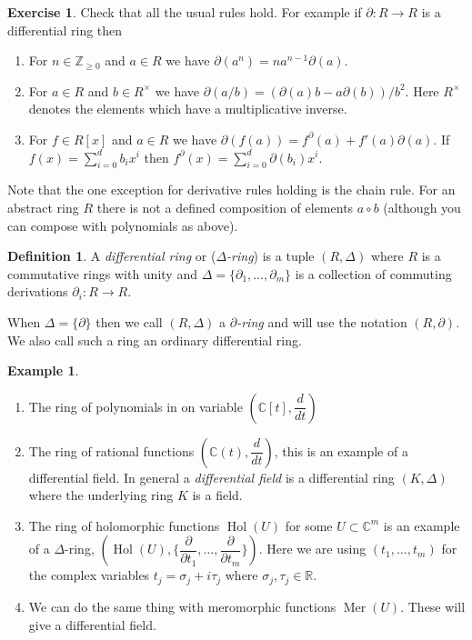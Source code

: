 \documentclass[12pt]{book}
\numberwithin{equation}{section}
\theoremstyle{definition}
\newtheorem{definition}[theorem]{Definition}
\newtheorem{example}[theorem]{Example}
\newtheorem{exercise}[theorem]{Exercise}
\theoremstyle{remark}
\newcommand{\ZZ}{\mathbb{Z}}
\newcommand{\RR}{\mathbb{R}}
\newcommand{\CC}{\mathbb{C}}
\newcommand{\hol}{\operatorname{Hol}}
\newcommand{\Mer}{\operatorname{Mer}}
\begin{document}
\begin{exercise}
	Check that all the usual rules hold. For example if $\partial:R \to R$ is a differential ring then 
	\begin{enumerate}
		\item For $n\in \ZZ_{\geq 0}$ and $a \in R$ we have $\partial(a^n) = na^{n-1}\partial(a)$.
		\item For $a \in R$ and $b\in R^{\times}$ we have $\partial(a/b) = (\partial(a)b - a \partial(b))/b^2$. Here $R^{\times}$ denotes the elements which have a multiplicative inverse.
		\item For $f \in R[x]$ and $a \in R$ we have $\partial(f(a)) = f^{\partial}(a) + f'(a)\partial(a)$. If $f(x) = \sum_{i=0}^d b_i x^i$ then $f^{\partial}(x) = \sum_{i=0}^d \partial(b_i) x^i$. 
	\end{enumerate}
\end{exercise}
Note that the one exception for derivative rules holding is the chain rule. 
For an abstract ring $R$ there is not a defined composition of elements $a\circ b$ (although you can compose with polynomials as above).


\begin{definition}
	A \emph{differential ring} or (\emph{$\Delta$-ring}) is a tuple $(R,\Delta)$ where $R$ is a commutative rings with unity and $\Delta = \lbrace \partial_1,\ldots,\partial_m\rbrace$ is a collection of commuting derivations $\partial_i:R \to R$. 
\end{definition}

When $\Delta = \lbrace \partial \rbrace$ then we call $(R,\Delta)$ a \emph{$\partial$-ring} and will use the notation $(R,\partial)$. 
We also call such a ring an ordinary differential ring. 


\begin{example}
	\begin{enumerate}
		\item The ring of polynomials in on variable $(\CC[t],\dfrac{d}{dt})$ 
		\item The ring of rational functions $(\CC(t), \dfrac{d}{dt})$, this is an example of a differential field. 
		In general a \emph{differential field} is a differential ring $(K,\Delta)$ where the underlying ring $K$ is a field. 
		\item The ring of holomorphic functions $\hol(U)$ for some $U\subset \CC^m$ is an example of a $\Delta$-ring, $(\hol(U), \lbrace \dfrac{\partial}{\partial t_1}, \ldots, \dfrac{\partial}{\partial t_m}\rbrace )$. 
		Here we are using $(t_1,\ldots,t_m)$ for the complex variables $t_j = \sigma_j + i \tau_j$ where $\sigma_j,\tau_j \in \RR$. 
		\item We can do the same thing with meromorphic functions $\Mer(U)$. These will give a differential field. 
	\end{enumerate}
\end{example}
\end{document}
